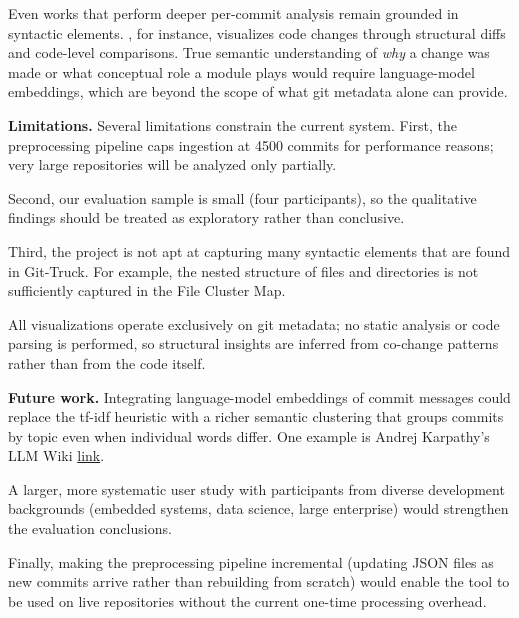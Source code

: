 \documentclass[12 pt]{article}
\begin{document}
Even works that perform deeper per-commit analysis remain grounded in
syntactic elements.
\cite{changeprism}, for instance, visualizes code changes through structural
diffs and code-level comparisons.
True semantic understanding of \emph{why} a
change was made or what conceptual role a module plays would require
language-model embeddings, which are beyond the scope of what git metadata
alone can provide.

\noindent\textbf{Limitations.}
Several limitations constrain the current system.
First, the preprocessing pipeline caps ingestion at 4500 commits for
performance reasons; very large repositories will be analyzed only partially.

Second, our evaluation sample is small (four participants), so the qualitative
findings should be treated as exploratory rather than conclusive.

Third, the project is not apt at capturing many syntactic elements that are 
found in Git-Truck. For example, the nested structure of files and directories
is not sufficiently captured in the File Cluster Map.

All visualizations operate exclusively on git metadata; no static
analysis or code parsing is performed, so structural insights are inferred
from co-change patterns rather than from the code itself.

\noindent\textbf{Future work.}
Integrating language-model embeddings of commit messages could replace the
tf-idf heuristic with a richer semantic clustering that groups commits by
topic even when individual words differ. One example is Andrej Karpathy's
LLM Wiki \href{https://gist.github.com/karpathy/442a6bf555914893e9891c11519de94f}{link}.

A larger, more systematic user study with participants from diverse
development backgrounds (embedded systems, data science, large enterprise)
would strengthen the evaluation conclusions.

Finally, making the preprocessing pipeline incremental (updating JSON files
as new commits arrive rather than rebuilding from scratch) would enable the
tool to be used on live repositories without the current one-time processing
overhead.
\end{document}
